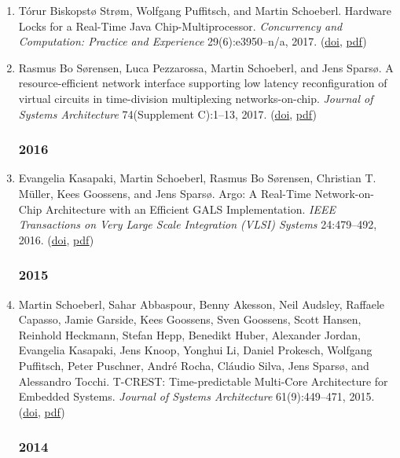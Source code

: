 \begin{enumerate}
\item T{\'o}rur Biskopst{\o} Str{\o}m, Wolfgang Puffitsch, and Martin Schoeberl.
 Hardware Locks for a Real-Time Java Chip-Multiprocessor.
 \emph{Concurrency and Computation: Practice and Experience} 29(6):e3950--n/a, 2017.
(\href{http://dx.doi.org/10.1002/cpe.3950}{doi}, \href{http://www.jopdesign.com/doc/jophwlocks.pdf}{pdf})

\item Rasmus Bo S{\o}rensen, Luca Pezzarossa, Martin Schoeberl, and Jens Spars{\o}.
 A resource-efficient network interface supporting low latency reconfiguration of virtual circuits in time-division multiplexing networks-on-chip.
 \emph{Journal of Systems Architecture} 74(Supplement C):1--13, 2017.
(\href{http://dx.doi.org/10.1016/j.sysarc.2017.02.001}{doi}, \href{http://www.jopdesign.com/doc/argo2.pdf}{pdf})


\subsubsection*{2016}

\item Evangelia Kasapaki, Martin Schoeberl, Rasmus Bo S{\o}rensen, Christian T. M\"uller, Kees Goossens, and Jens Spars{\o}.
 Argo: A Real-Time Network-on-Chip Architecture with an Efficient GALS Implementation.
 \emph{IEEE Transactions on Very Large Scale Integration (VLSI) Systems} 24:479--492, 2016.
(\href{http://dx.doi.org/10.1109/TVLSI.2015.2405614}{doi}, \href{http://www.jopdesign.com/doc/argo-jnl.pdf}{pdf})


\subsubsection*{2015}

\item Martin Schoeberl, Sahar Abbaspour, Benny Akesson, Neil Audsley, Raffaele Capasso, Jamie Garside, Kees Goossens, Sven Goossens, Scott Hansen, Reinhold Heckmann, Stefan Hepp, Benedikt Huber, Alexander Jordan, Evangelia Kasapaki, Jens Knoop, Yonghui Li, Daniel Prokesch, Wolfgang Puffitsch, Peter Puschner, Andr\'{e} Rocha, Cl\'{a}udio Silva, Jens Spars{\o}, and Alessandro Tocchi.
 T-CREST: Time-predictable Multi-Core Architecture for Embedded Systems.
 \emph{Journal of Systems Architecture} 61(9):449--471, 2015.
(\href{http://dx.doi.org/10.1016/j.sysarc.2015.04.002}{doi}, \href{http://www.jopdesign.com/doc/t-crest-jnl.pdf}{pdf})


\subsubsection*{2014}



\end{enumerate}
